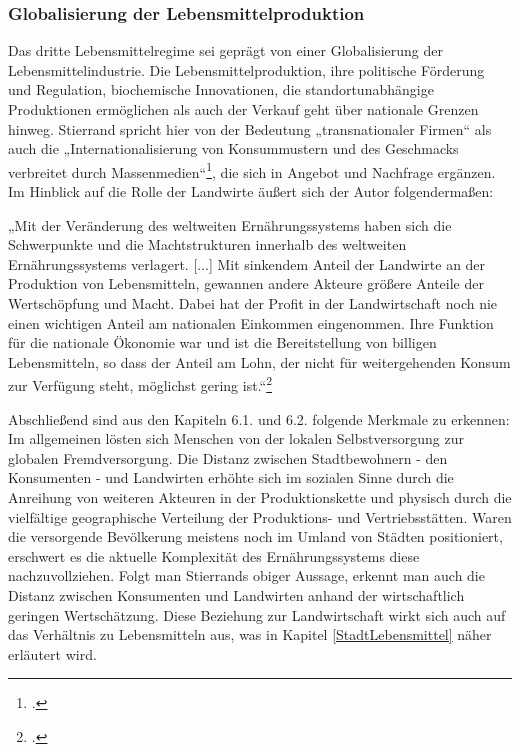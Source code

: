 \documentclass{scrartcl}
\begin{document}
\subsubsection*{Globalisierung der Lebensmittelproduktion}
Das dritte Lebensmittelregime sei geprägt von einer Globalisierung der Lebensmittelindustrie. Die Lebensmittelproduktion, ihre politische Förderung und Regulation, biochemische Innovationen, die standortunabhängige Produktionen ermöglichen als auch der Verkauf geht über nationale Grenzen hinweg. Stierrand spricht hier von der Bedeutung „transnationaler Firmen“ als auch die „Internationalisierung von Konsummustern und des Geschmacks verbreitet durch Massenmedien“\footcites[Vgl.][S.24ff]{Stierand2008StadtLebensmittel}, die sich in Angebot und Nachfrage ergänzen. Im Hinblick auf die Rolle der Landwirte äußert sich der Autor folgendermaßen:
\begin{displayquote}
„Mit der Veränderung des weltweiten Ernährungssystems haben sich die Schwerpunkte und die Machtstrukturen innerhalb des weltweiten Ernährungssystems verlagert. [...] Mit sinkendem Anteil der Landwirte an der Produktion von Lebensmitteln, gewannen andere Akteure größere Anteile der Wertschöpfung und Macht. Dabei hat der Profit in der Landwirtschaft noch nie einen wichtigen Anteil am nationalen Einkommen eingenommen. Ihre Funktion für die nationale Ökonomie war und ist die Bereitstellung von billigen Lebensmitteln, so dass der Anteil am Lohn, der nicht für weitergehenden Konsum zur Verfügung steht, möglichst gering ist.“\footcite[S.25]{Stierand2008StadtLebensmittel}
\end{displayquote}

Abschließend sind aus den Kapiteln 6.1. und 6.2. folgende Merkmale zu erkennen: Im allgemeinen lösten sich Menschen von der lokalen Selbstversorgung zur globalen Fremdversorgung. Die Distanz zwischen Stadtbewohnern - den Konsumenten - und Landwirten erhöhte sich im sozialen Sinne durch die Anreihung von weiteren Akteuren in der Produktionskette und physisch durch die vielfältige geographische Verteilung der Produktions- und Vertriebsstätten. Waren die versorgende Bevölkerung meistens noch im Umland von Städten positioniert, erschwert es die aktuelle Komplexität des Ernährungssystems diese nachzuvollziehen. Folgt man Stierrands obiger Aussage, erkennt man auch die Distanz zwischen Konsumenten und Landwirten anhand der wirtschaftlich geringen Wertschätzung. Diese Beziehung zur Landwirtschaft wirkt sich auch auf das Verhältnis zu Lebensmitteln aus, was in Kapitel \ref{StadtLebensmittel} näher erläutert wird. 
\end{document}
